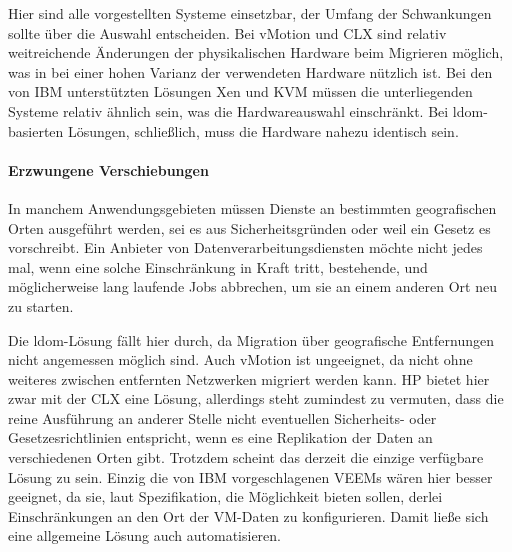 Hier sind alle vorgestellten Systeme einsetzbar, der Umfang der
Schwankungen sollte über die Auswahl entscheiden. Bei vMotion und
\ac{CLX} sind relativ weitreichende Änderungen der physikalischen
Hardware beim Migrieren möglich, was in bei einer hohen Varianz der
verwendeten Hardware nützlich ist. Bei den von IBM unterstützten
Lösungen Xen und \ac{KVM} müssen die unterliegenden Systeme relativ
ähnlich sein, was die Hardwareauswahl einschränkt. Bei
\ac{ldom}-basierten Lösungen, schließlich, muss die Hardware nahezu
identisch sein.


\paragraph*{Erzwungene Verschiebungen}
In manchem Anwendungsgebieten müssen Dienste an bestimmten
geografischen Orten ausgeführt werden, sei es aus Sicherheitsgründen
oder weil ein Gesetz es vorschreibt. Ein Anbieter von
Datenverarbeitungsdiensten möchte nicht jedes mal, wenn eine solche
Einschränkung in Kraft tritt, bestehende, und möglicherweise lang
laufende Jobs abbrechen, um sie an einem anderen Ort neu zu starten.

Die \ac{ldom}-Lösung fällt hier durch, da Migration über geografische
Entfernungen nicht angemessen möglich sind. Auch vMotion ist
ungeeignet, da nicht ohne weiteres zwischen entfernten Netzwerken
migriert werden kann. HP bietet hier zwar mit der \ac{CLX} eine
Lösung, allerdings steht zumindest zu vermuten, dass die reine
Ausführung an anderer Stelle nicht eventuellen Sicherheits- oder
Gesetzesrichtlinien entspricht, wenn es eine Replikation der Daten an
verschiedenen Orten gibt. Trotzdem scheint das derzeit die einzige
verfügbare Lösung zu sein. Einzig die von IBM vorgeschlagenen
\acp{VEEM} wären hier besser geeignet, da sie, laut Spezifikation, die
Möglichkeit bieten sollen, derlei Einschränkungen an den Ort der
\ac{VM}-Daten zu konfigurieren. Damit ließe sich eine allgemeine
Lösung auch automatisieren.



